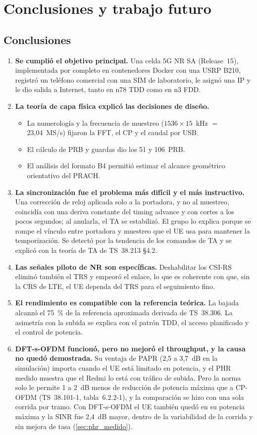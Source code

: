 \section{Conclusiones y trabajo futuro}\label{sec:conclusiones}

\subsection{Conclusiones}
\begin{enumerate}
  \item \textbf{Se cumplió el objetivo principal.} Una celda 5G NR SA (Release~15), implementada por completo en contenedores Docker con una USRP B210, registró un teléfono comercial con una SIM de laboratorio, le asignó una IP y le dio salida a Internet, tanto en n78 TDD como en n3 FDD.
  \item \textbf{La teoría de capa física explicó las decisiones de diseño.}
  \begin{itemize}
    \item La numerología y la frecuencia de muestreo ($1536\times 15$~kHz $=$ 23,04~MS/s) fijaron la FFT, el CP y el caudal por USB.
    \item El cálculo de PRB y guardas dio los 51 y 106~PRB.
    \item El análisis del formato B4 permitió estimar el alcance geométrico orientativo del PRACH.
  \end{itemize}
  \item \textbf{La sincronización fue el problema más difícil y el más instructivo.} Una corrección de reloj aplicada solo a la portadora, y no al muestreo, coincidía con una deriva constante del timing advance y con cortes a los pocos segundos; al anularla, el TA se estabilizó. El grupo lo explica porque se rompe el vínculo entre portadora y muestreo que el UE usa para mantener la temporización. Se detectó por la tendencia de los comandos de TA y se explicó con la teoría de TA de TS~38.213 §4.2.
  \item \textbf{Las señales piloto de NR son específicas.} Deshabilitar los CSI-RS eliminó también el TRS y empeoró el enlace, lo que es coherente con que, sin la CRS de LTE, el UE dependa del TRS para el seguimiento fino.
  \item \textbf{El rendimiento es compatible con la referencia teórica.} La bajada alcanzó el 75~\% de la referencia aproximada derivada de TS~38.306. La asimetría con la subida se explica con el patrón TDD, el acceso planificado y el control de potencia.
  \item \textbf{DFT-s-OFDM funcionó, pero no mejoró el throughput, y la causa no quedó demostrada.} Su ventaja de PAPR (2,5 a 3,7~dB en la simulación) importa cuando el UE está limitado en potencia, y el PHR medido muestra que el Redmi lo está con tráfico de subida. Pero la norma solo le permite 1 a 2~dB menos de reducción de potencia máxima que a CP-OFDM (TS~38.101-1, tabla~6.2.2-1), y la comparación se hizo con una sola corrida por tramo. Con DFT-s-OFDM el UE también quedó en su potencia máxima y la SINR fue 2,4~dB mayor, dentro de la variabilidad de la corrida y sin mejora de tasa (\cref{sec:phr_medido}).

\end{enumerate}
